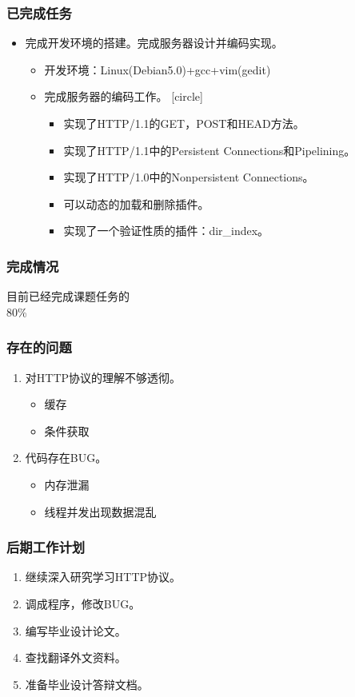 \documentclass[12pt]{beamer}
\begin{document}
\begin{CJK}{UTF8}{gbsn}
\begin{frame}
	\frametitle{已完成任务}
	\begin{itemize}
		\item 完成开发环境的搭建。完成服务器设计并编码实现。
		\begin{itemize}
			\item 开发环境：Linux(Debian5.0)+gcc+vim(gedit)
			\item 完成服务器的编码工作。
			\pause
			\begin{itemize}
				\item 实现了HTTP/1.1的GET，POST和HEAD方法。
				\item 实现了HTTP/1.1中的Persistent Connections和Pipelining。
				\item 实现了HTTP/1.0中的Nonpersistent Connections。
				\item 可以动态的加载和删除插件。
				\item 实现了一个验证性质的插件：dir\_index。
			\end{itemize}
		\end{itemize}
	\end{itemize}
\end{frame}

\begin{frame}
	\begin{center}
		\frametitle{完成情况}
		\pause
		\LARGE{目前已经完成课题任务的}\\
		\Huge{80\%}
		\\
	\end{center}
\end{frame}

\begin{frame}
	\frametitle{存在的问题}
	\begin{enumerate}
		\item 对HTTP协议的理解不够透彻。
			\begin{itemize}
				\item 缓存
				\item 条件获取
			\end{itemize}
		\pause
		\item 代码存在BUG。
			\begin{itemize}
				\item 内存泄漏
				\item 线程并发出现数据混乱
			\end{itemize}
	\end{enumerate}
\end{frame}

\begin{frame}
	\frametitle{后期工作计划}
	\begin{enumerate}
		\item 继续深入研究学习HTTP协议。
		\item 调成程序，修改BUG。
		\item 编写毕业设计论文。
		\item 查找翻译外文资料。
		\item 准备毕业设计答辩文档。
	\end{enumerate}
\end{frame}

\end{CJK}
\end{document}
